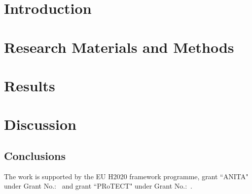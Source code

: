 \documentclass[manuscript, review, screen]{acmart}
\begin{document}
\section{Introduction}


\section{Research Materials and Methods}\label{mm}


\section{Results}\label{res}


\section{Discussion}\label{disc}

\begin{acks}

\section{Conclusions}\label{conc}


The work is supported by the EU H2020  framework programme, grant ``ANITA" under Grant No.:~ and grant ``PRoTECT" under Grant No.:~.

\end{acks}



\end{document}
